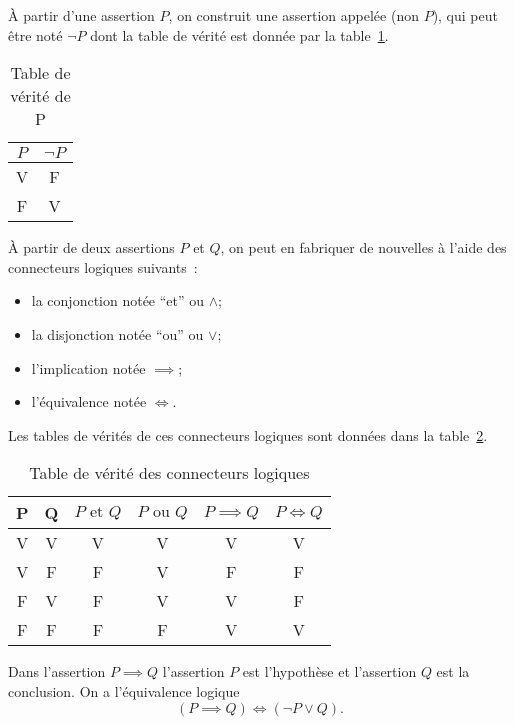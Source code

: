À partir d'une assertion \(P\), on construit une assertion appelée (non \(P\)),
qui peut être noté \(\neg P\) dont la table de vérité est donnée par la
table~\ref{tab:tabveriteP}.

\begin{table}[!h]
  \centering
  \begin{tabular}{cc}\toprule
    \(P\) & \(\neg{}P\) \\ \midrule
    V & F \\ F & V \\ \bottomrule
  \end{tabular}
  \caption{Table de vérité de P}\label{tab:tabveriteP}
\end{table}

À partir de deux assertions \(P\) et \(Q\), on peut en fabriquer de nouvelles à
l'aide des connecteurs logiques suivants~:
\begin{itemize}
  \item la conjonction notée ``et'' ou \(\wedge\);
  \item la disjonction notée ``ou'' ou \(\vee\);
  \item l'implication notée \(\implies\);
  \item l'équivalence notée \(\iff\).
\end{itemize}

Les tables de vérités de ces connecteurs logiques sont données dans la
table~\ref{tab:tabverconn}.

\begin{table}[!h]
  \centering
  \begin{tabular}{cccccc}\toprule
    P & Q & \(P \text{~et~} Q\) & \(P \text{~ou~} Q\) & \(P \implies Q\) &
    \(P \iff Q\) \\ \midrule
    V & V & V & V & V & V \\
    V & F & F & V & F & F \\
    F & V & F & V & V & F \\
    F & F & F & F & V & V \\ \bottomrule
  \end{tabular}
  \caption{Table de vérité des connecteurs logiques}\label{tab:tabverconn}
\end{table}

Dans l'assertion \(P \implies Q\) l'assertion \(P\) est l'hypothèse et
l'assertion \(Q\) est la conclusion. On a l'équivalence logique
\begin{equation}
  \boxed{(P \implies{} Q) \iff{} (\neg{P} \lor Q).}
\end{equation}

